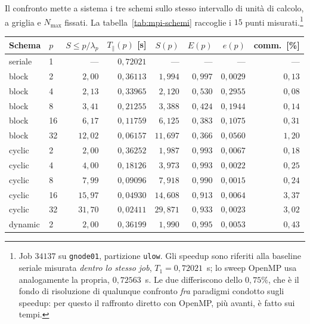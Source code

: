Il confronto mette a sistema i tre schemi sullo stesso intervallo di unità di
calcolo, a griglia e $N_{\max}$ fissati. La tabella~\ref{tab:mpi-schemi}
raccoglie i $15$ punti misurati.\footnote{Job $34137$ su \texttt{gnode01},
    partizione \texttt{ulow}. Gli speedup sono riferiti alla baseline seriale
    misurata \emph{dentro lo stesso job}, $T_1 = 0{,}72021$~s; lo sweep OpenMP usa
    analogamente la propria, $0{,}72563$~s. Le due differiscono dello $0{,}75\%$, che
    è il fondo di risoluzione di qualunque confronto \emph{fra} paradigmi condotto
    sugli speedup: per questo il raffronto diretto con OpenMP, più avanti, è fatto
    sui tempi.}
\vspace{2,5mm}
\begin{table}[htbp]
    \centering
    \begin{tabular}{llrrrrrr}
        \hline
        Schema & $p$ & $S \le p/\lambda_p$ & $T_\parallel(p)$ [s] & $S(p)$ & $E(p)$ & $e(p)$ & comm.\ [\%] \\
        \hline
        seriale  & 1  & ---     & $0{,}72021$ & --- & --- & --- & --- \\
        \hline
        block    & 2  & $2{,}00$  & $0{,}36113$ & $1{,}994$  & $0{,}997$ & $0{,}0029$ & $0{,}13$ \\
        block    & 4  & $2{,}13$  & $0{,}33965$ & $2{,}120$  & $0{,}530$ & $0{,}2955$ & $0{,}08$ \\
        block    & 8  & $3{,}41$  & $0{,}21255$ & $3{,}388$  & $0{,}424$ & $0{,}1944$ & $0{,}14$ \\
        block    & 16 & $6{,}17$  & $0{,}11759$ & $6{,}125$  & $0{,}383$ & $0{,}1075$ & $0{,}31$ \\
        block    & 32 & $12{,}02$ & $0{,}06157$ & $11{,}697$ & $0{,}366$ & $0{,}0560$ & $1{,}20$ \\
        \hline
        cyclic   & 2  & $2{,}00$  & $0{,}36252$ & $1{,}987$  & $0{,}993$ & $0{,}0067$ & $0{,}18$ \\
        cyclic   & 4  & $4{,}00$  & $0{,}18126$ & $3{,}973$  & $0{,}993$ & $0{,}0022$ & $0{,}25$ \\
        cyclic   & 8  & $7{,}99$  & $0{,}09096$ & $7{,}918$  & $0{,}990$ & $0{,}0015$ & $0{,}24$ \\
        cyclic   & 16 & $15{,}97$ & $0{,}04930$ & $14{,}608$ & $0{,}913$ & $0{,}0064$ & $3{,}37$ \\
        cyclic   & 32 & $31{,}70$ & $0{,}02411$ & $29{,}871$ & $0{,}933$ & $0{,}0023$ & $3{,}02$ \\
        \hline
        dynamic  & 2  & $2{,}00$  & $0{,}36199$ & $1{,}990$  & $0{,}995$ & $0{,}0053$ & $0{,}43$ \\

\end{tabular}
\end{table}
